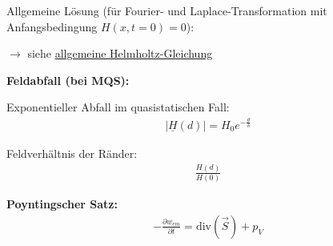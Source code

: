 Allgemeine Lösung (für Fourier- und Laplace-Transformation mit Anfangsbedingung $H(x, t = 0) = 0$):

$\rightarrow$ siehe \hyperlink{helmholtz_allgemeine_loesung}{allgemeine Helmholtz-Gleichung}

\textbf{Feldabfall (bei MQS):}


Exponentieller Abfall im quasistatischen Fall:
\begin{align}
|\underline{H}(d)| = H_0 e^{-\frac{d}{\delta}}
\end{align}


Feldverhältnis der Ränder: 
\begin{align}
\frac{H(d)}{H(0)}
\end{align}


\textbf{Poyntingscher Satz:}
\begin{align}
-\frac{\partial w_{em}}{\partial t} = \text{div}(\vec{S}) + p_V
\end{align}
